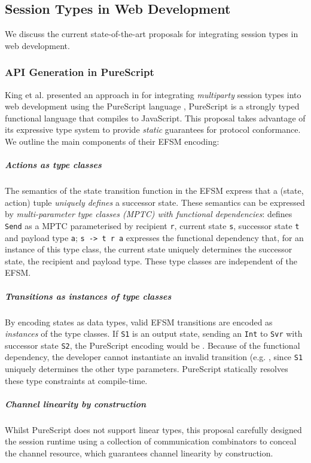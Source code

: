 \subsection{Session Types in Web Development}
\label{subsection:sessiontypewebdev}

We discuss the current state-of-the-art proposals
for integrating session types in web development.

\subsubsection{API Generation in PureScript}
King et al. presented an approach in \cite{PureScript2019}
for integrating \textit{multiparty} session types 
into web development using 
the PureScript language \cite{PureScript},
PureScript is a strongly typed functional language
that compiles to JavaScript.
This proposal takes advantage of its expressive type system to 
provide \textit{static} guarantees for protocol conformance.
We outline the main components of their EFSM encoding:

\subparagraph{Actions as type classes} 
The semantics of the state transition function 
in the EFSM express that a (state, action) tuple
\textit{uniquely defines} a successor state. 
These semantics can be expressed by 
\textit{multi-parameter type classes (MPTC) 
with functional dependencies}: 
defines \texttt{Send} as a MPTC 
parameterised by recipient \texttt{r}, 
current state \texttt{s}, successor state \texttt{t} 
and payload type \texttt{a}; 
\texttt{s -> t r a} expresses the functional dependency that, 
for an instance of this type class, 
the current state uniquely determines the
successor state, the recipient and payload type. 
These type classes are independent of the EFSM.

\subparagraph{Transitions as instances of type classes} 
By encoding states as data types, 
valid EFSM transitions are encoded as 
\textit{instances} of the type classes. 
If \texttt{S1} is an output state, 
sending an \texttt{Int} to \texttt{Svr} with 
successor state \texttt{S2}, the PureScript encoding would be
.
Because of the functional dependency, 
the developer cannot instantiate an invalid transition 
(e.g. , 
since \texttt{S1} uniquely determines the other type parameters. 
PureScript statically resolves these type constraints at
compile-time.

\subparagraph{Channel linearity by construction}
Whilst PureScript does not support linear types,
this proposal carefully designed the session runtime using 
a collection of communication combinators to conceal the
channel resource, which guarantees channel linearity by construction.\\

